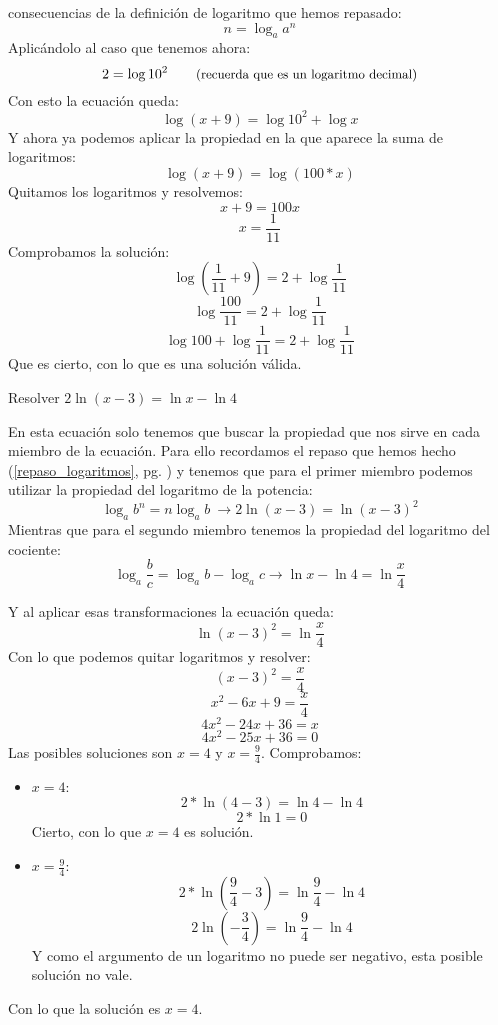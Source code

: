 \documentclass[a4paper,11pt,answers]{exam}
\begin{document}
\begin{itemize}
\begin{questions}
\begin{solution}
      consecuencias de la definición de logaritmo que hemos repasado:
      \[n = \log_a a^n\]
      Aplicándolo al caso que tenemos ahora:
      \[2 = \log 10^2\quad\quad\text{\small{(recuerda que es un logaritmo decimal)}}\]
      Con esto la ecuación queda:
      \[\log (x+9) = \log 10^2 + \log x\]
      Y ahora ya podemos aplicar la propiedad en la que aparece la suma de logaritmos:
      \[\log (x+9) = \log (100*x)\]
      Quitamos los logaritmos y resolvemos:
      \[x + 9 = 100x\]
      \[x = \frac{1}{11}\]
      Comprobamos la solución:
      \[\log (\frac{1}{11} + 9) = 2 + \log \frac{1}{11}\]
      \[\log \frac{100}{11} = 2 + \log \frac{1}{11}\]
      \[\log 100 + \log\frac{1}{11} = 2 + \log \frac{1}{11}\]
      Que es cierto, con lo que es una solución válida.
    \end{solution}
  \question Resolver $2\ln (x - 3) = \ln x - \ln 4$
    \begin{solution}
      En esta ecuación solo tenemos que buscar la propiedad que nos sirve en cada miembro de la
      ecuación. Para ello recordamos el repaso que hemos hecho (\ref{repaso_logaritmos}, pg.
      \pageref{repaso_logaritmos}) y tenemos que para el primer miembro podemos utilizar la propiedad
      del logaritmo de la potencia:
      \[\log_a b^n = n\log_a b\ \longrightarrow 2\ln (x-3) = \ln (x-3)^2\]
      Mientras que para el segundo miembro tenemos la propiedad del logaritmo del cociente:
      \[\log_a \frac{b}{c} = \log_a b - \log_a c \longrightarrow \ln x - \ln 4 = \ln \frac{x}{4}\]

      Y al aplicar esas transformaciones la ecuación queda:
      \[\ln (x-3)^2 = \ln \frac{x}{4}\]
      Con lo que podemos quitar logaritmos y resolver:
      \[(x-3)^2 = \frac{x}{4}\]
      \[x^2 - 6x + 9 = \frac{x}{4}\]
      \[4x^2 - 24 x + 36 = x\]
      \[4x^2 - 25x + 36 = 0\]
      Las posibles soluciones son $x = 4$ y $x = \frac{9}{4}$. Comprobamos:
      \begin{itemize}
      \item $x = 4$:
        \[2*\ln (4 - 3) = \ln 4 - \ln 4\]
        \[2*\ln 1 = 0\]
        Cierto, con lo que $x = 4$ es solución.
      \item $x = \frac{9}{4}$:
        \[2*\ln \left( \frac{9}{4} - 3 \right) = \ln \frac{9}{4} - \ln 4\]
        \[2\ln \left(-\frac{3}{4}\right) = \ln \frac{9}{4} - \ln 4\]
        Y como el argumento de un logaritmo no puede ser negativo, esta posible solución no vale.
      \end{itemize}
      Con lo que la solución es $x = 4$.
    \end{solution}
  \end{questions}


\end{itemize}
\end{document}

